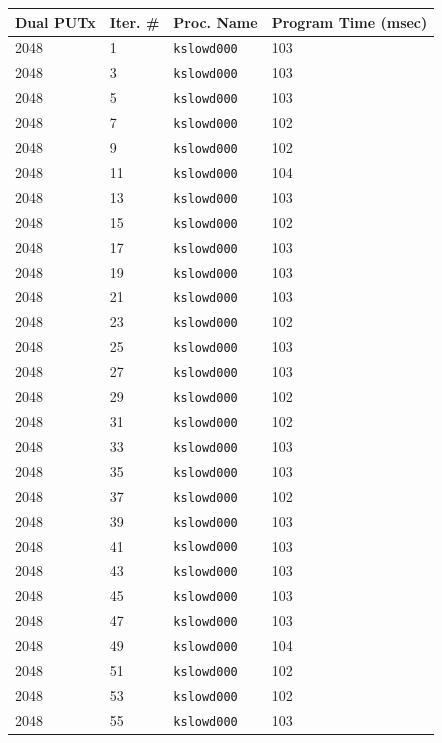\documentclass[10pt]{article}
\begin{document}
\begin{table}[htp!]
\centering
{
 \begin{tabular}{|l|l|l|l|} \hline
Dual PUTx & Iter. \# & Proc. Name & Program Time (msec)\\ \hline
2048 & 1 & {\tt kslowd000} & 103 \\ \hline
2048 & 3 & {\tt kslowd000} & 103 \\ \hline
2048 & 5 & {\tt kslowd000} & 103 \\ \hline
2048 & 7 & {\tt kslowd000} & 102 \\ \hline
2048 & 9 & {\tt kslowd000} & 102 \\ \hline
2048 & 11 & {\tt kslowd000} & 104 \\ \hline
2048 & 13 & {\tt kslowd000} & 103 \\ \hline
2048 & 15 & {\tt kslowd000} & 102 \\ \hline
2048 & 17 & {\tt kslowd000} & 103 \\ \hline
2048 & 19 & {\tt kslowd000} & 103 \\ \hline
2048 & 21 & {\tt kslowd000} & 103 \\ \hline
2048 & 23 & {\tt kslowd000} & 102 \\ \hline
2048 & 25 & {\tt kslowd000} & 103 \\ \hline
2048 & 27 & {\tt kslowd000} & 103 \\ \hline
2048 & 29 & {\tt kslowd000} & 102 \\ \hline
2048 & 31 & {\tt kslowd000} & 102 \\ \hline
2048 & 33 & {\tt kslowd000} & 103 \\ \hline
2048 & 35 & {\tt kslowd000} & 103 \\ \hline
2048 & 37 & {\tt kslowd000} & 102 \\ \hline
2048 & 39 & {\tt kslowd000} & 103 \\ \hline
2048 & 41 & {\tt kslowd000} & 103 \\ \hline
2048 & 43 & {\tt kslowd000} & 103 \\ \hline
2048 & 45 & {\tt kslowd000} & 103 \\ \hline
2048 & 47 & {\tt kslowd000} & 103 \\ \hline
2048 & 49 & {\tt kslowd000} & 104 \\ \hline
2048 & 51 & {\tt kslowd000} & 102 \\ \hline
2048 & 53 & {\tt kslowd000} & 102 \\ \hline
2048 & 55 & {\tt kslowd000} & 103 \\ \hline

\end{tabular}}
\end{table}
\end{document}
